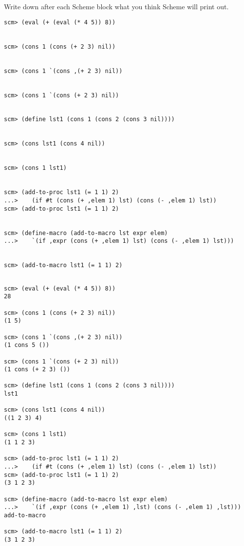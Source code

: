 \question Write down after each Scheme block what you think Scheme will print out.
\begin{lstlisting}
scm> (eval (+ (eval (* 4 5)) 8))


scm> (cons 1 (cons (+ 2 3) nil))


scm> (cons 1 `(cons ,(+ 2 3) nil))


scm> (cons 1 `(cons (+ 2 3) nil))


scm> (define lst1 (cons 1 (cons 2 (cons 3 nil))))


scm> (cons lst1 (cons 4 nil))


scm> (cons 1 lst1)


scm> (add-to-proc lst1 (= 1 1) 2)
...>    (if #t (cons (+ ,elem 1) lst) (cons (- ,elem 1) lst))
scm> (add-to-proc lst1 (= 1 1) 2)


scm> (define-macro (add-to-macro lst expr elem)
...>    `(if ,expr (cons (+ ,elem 1) lst) (cons (- ,elem 1) lst)))


scm> (add-to-macro lst1 (= 1 1) 2)


\end{lstlisting}
\begin{solution}
\begin{lstlisting}
scm> (eval (+ (eval (* 4 5)) 8))
28

scm> (cons 1 (cons (+ 2 3) nil))
(1 5)

scm> (cons 1 `(cons ,(+ 2 3) nil))
(1 cons 5 ())

scm> (cons 1 `(cons (+ 2 3) nil))
(1 cons (+ 2 3) ())

scm> (define lst1 (cons 1 (cons 2 (cons 3 nil))))
lst1

scm> (cons lst1 (cons 4 nil))
((1 2 3) 4)

scm> (cons 1 lst1)
(1 1 2 3)

scm> (add-to-proc lst1 (= 1 1) 2)
...>    (if #t (cons (+ ,elem 1) lst) (cons (- ,elem 1) lst))
scm> (add-to-proc lst1 (= 1 1) 2)
(3 1 2 3)

scm> (define-macro (add-to-macro lst expr elem)
...>    `(if ,expr (cons (+ ,elem 1) ,lst) (cons (- ,elem 1) ,lst)))
add-to-macro

scm> (add-to-macro lst1 (= 1 1) 2)
(3 1 2 3)
\end{lstlisting}
\end{solution}
